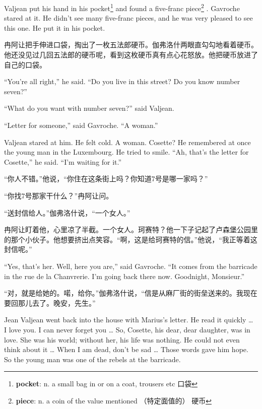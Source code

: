 \documentclass[fontset=ubuntu, zihao=5]{ctexart}
\begin{document}
\begin{paracol}{2}
\switchcolumn*

Valjean put his hand in his pocket\footnote{\textbf{pocket}: n. a small bag
  in or on a coat, trousers etc 口袋} and found a five-franc
piece\footnote{\textbf{piece}: n. a coin of the value mentioned （特定面值的）
  硬币} . Gavroche stared at it. He didn't see many five-franc pieces, and
he was very pleased to see this one. He put it in his pocket.

\switchcolumn

冉阿让把手伸进口袋，掏出了一枚五法郎硬币。伽弗洛什两眼直勾勾地看着硬币。他还没见过几回五法郎的硬币呢，看到这枚硬币真有点心花怒放。他把硬币放进了自己的口袋。

\switchcolumn*

``You're all right,'' he said. ``Do you live in this street? Do you know number seven?''

``What do you want with number seven?'' said Valjean.

``Letter for someone,'' said Gavroche. ``A woman.''

Valjean stared at him. He felt cold. A woman. Cosette? He remembered at once the young man in the Luxembourg. He tried to smile. ``Ah, that's the letter for Cosette,'' he said. ``I'm waiting for it.''

\switchcolumn

“你人不错。”他说，“你住在这条街上吗？你知道7号是哪一家吗？”

“你找7号那家干什么？”冉阿让问。

“送封信给人。”伽弗洛什说，“一个女人。”

冉阿让盯着他，心里凉了半截。一个女人。珂赛特？他一下子记起了卢森堡公园里的那个小伙子。他想要挤出点笑容。“啊，这是给珂赛特的信。”他说，“我正等着这封信呢。”

\switchcolumn*

``Yes, that's her. Well, here you are,'' said Gavroche. ``It comes from the barricade in the rue de la Chanvrerie. I'm going back there now. Goodnight, Monsieur.''


\switchcolumn

“对，就是给她的。喏，给你。”伽弗洛什说，“信是从麻厂街的街垒送来的。我现在要回那儿去了。晚安，先生。”

\switchcolumn*

Jean Valjean went back into the house with Marius's letter. He read it quickly \ldots{} I love you. I can never forget you \ldots{} So, Cosette, his dear, dear daughter, was in love. She was his world; without her, his life was nothing. He could not even think about it \ldots{} When I am dead, don't be sad \ldots{} Those words gave him hope. So the young man was one of the rebels at the barricade.


\end{paracol}
\end{document}
